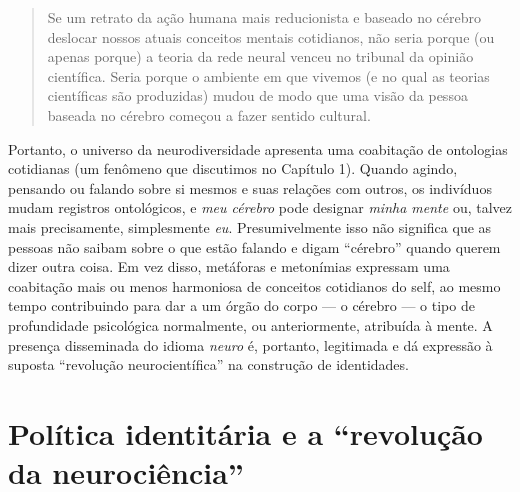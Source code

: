 \begin{quote}
Se um retrato da ação humana mais reducionista e baseado no cérebro
deslocar nossos atuais conceitos mentais cotidianos, não seria porque
(ou apenas porque) a teoria da rede neural venceu no tribunal da opinião
científica. Seria porque o ambiente em que vivemos (e no qual as teorias
científicas são produzidas) mudou de modo que uma visão da pessoa
baseada no cérebro começou a fazer sentido cultural.
\end{quote}

Portanto, o universo da neurodiversidade apresenta uma coabitação de
ontologias cotidianas (um fenômeno que discutimos no Capítulo 1). Quando
agindo, pensando ou falando sobre si mesmos e suas relações com outros,
os indivíduos mudam registros ontológicos, e \emph{meu cérebro} pode
designar \emph{minha mente} ou, talvez mais precisamente, simplesmente
\emph{eu}. Presumivelmente isso não significa que as pessoas não saibam
sobre o que estão falando e digam ``cérebro'' quando querem dizer outra
coisa. Em vez disso, metáforas e metonímias expressam uma coabitação
mais ou menos harmoniosa de conceitos cotidianos do self, ao mesmo tempo
contribuindo para dar a um órgão do corpo --- o cérebro --- o tipo de
profundidade psicológica normalmente, ou anteriormente, atribuída à
mente. A presença disseminada do idioma \emph{neuro} é, portanto,
legitimada e dá expressão à suposta ``revolução neurocientífica'' na
construção de identidades.

\chapter{Política identitária e a ``revolução da neurociência''}

